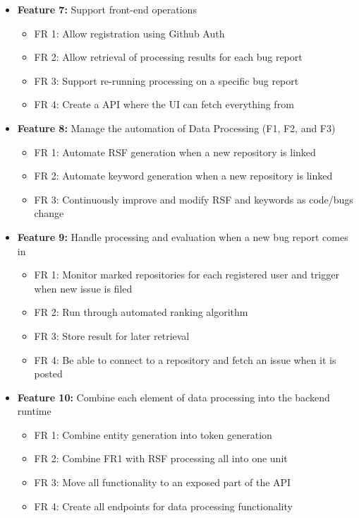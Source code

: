 \documentclass[11pt,]{article}
\providecommand{\tightlist}{%
  \setlength{\itemsep}{0pt}\setlength{\parskip}{0pt}}
\begin{document}
\begin{itemize}
\tightlist
\item
  \textbf{Feature 7:} Support front-end operations

  \begin{itemize}
  \tightlist
  \item
    FR 1: Allow registration using Github Auth
  \item
    FR 2: Allow retrieval of processing results for each bug report
  \item
    FR 3: Support re-running processing on a specific bug report
  \item
    FR 4: Create a API where the UI can fetch everything from
  \end{itemize}
\item
  \textbf{Feature 8:} Manage the automation of Data Processing (F1, F2,
  and F3)

  \begin{itemize}
  \tightlist
  \item
    FR 1: Automate RSF generation when a new repository is linked
  \item
    FR 2: Automate keyword generation when a new repository is linked
  \item
    FR 3: Continuously improve and modify RSF and keywords as code/bugs
    change
  \end{itemize}
\item
  \textbf{Feature 9:} Handle processing and evaluation when a new bug
  report comes in

  \begin{itemize}
  \tightlist
  \item
    FR 1: Monitor marked repositories for each registered user and
    trigger when new issue is filed
  \item
    FR 2: Run through automated ranking algorithm
  \item
    FR 3: Store result for later retrieval
  \item
    FR 4: Be able to connect to a repository and fetch an issue when it
    is posted
  \end{itemize}
\item
  \textbf{Feature 10:} Combine each element of data processing into the
  backend runtime

  \begin{itemize}
  \tightlist
  \item
    FR 1: Combine entity generation into token generation
  \item
    FR 2: Combine FR1 with RSF processing all into one unit
  \item
    FR 3: Move all functionality to an exposed part of the API
  \item
    FR 4: Create all endpoints for data processing functionality
  \end{itemize}
\end{itemize}
\end{document}
